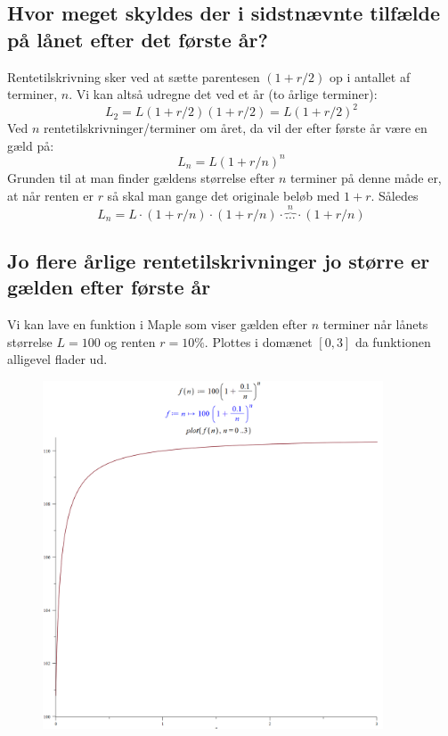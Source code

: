 \documentclass{report}
\begin{document}
\subsection{Hvor meget skyldes der i sidstnævnte tilfælde på lånet efter det første år?}
Rentetilskrivning sker ved at sætte parentesen $(1+r/2)$ op i antallet af terminer, $n$. Vi kan altså udregne det ved et år (to årlige terminer):\begin{equation}
    L_2=L(1+r/2)(1+r/2)=L(1+r/2)^2
\end{equation}
Ved $n$ rentetilskrivninger/terminer om året, da vil der efter første år være en gæld på:\begin{equation}
    L_n=L(1+r/n)^n
\end{equation}
Grunden til at man finder gældens størrelse efter $n$ terminer på denne måde er, at når renten er $r$ så skal man gange det originale beløb med $1+r$. Således $$L_n=L\cdot(1+r/n)\cdot(1+r/n)\cdot\! \overbrace{\ldots}^n\cdot(1+r/n)$$
\newpage\subsection{Jo flere årlige rentetilskrivninger jo større er gælden efter første år}
Vi kan lave en funktion i Maple som viser gælden efter $n$ terminer når lånets størrelse $L=100$ og renten $r=10\%$. Plottes i domænet $[0,3]$ da funktionen alligevel flader ud.
\begin{figure}[H]
    \centering
    \includegraphics[width=0.9\textwidth]{javaw_WZOXp5TLXq.png}
\end{figure}
\end{document}
